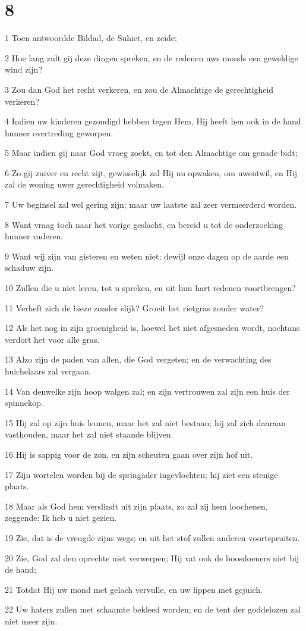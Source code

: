 \chapter{8}

\par 1 Toen antwoordde Bildad, de Suhiet, en zeide:
\par 2 Hoe lang zult gij deze dingen spreken, en de redenen uws monds een geweldige wind zijn?
\par 3 Zou dan God het recht verkeren, en zou de Almachtige de gerechtigheid verkeren?
\par 4 Indien uw kinderen gezondigd hebben tegen Hem, Hij heeft hen ook in de hand hunner overtreding geworpen.
\par 5 Maar indien gij naar God vroeg zoekt, en tot den Almachtige om genade bidt;
\par 6 Zo gij zuiver en recht zijt, gewisselijk zal Hij nu opwaken, om uwentwil, en Hij zal de woning uwer gerechtigheid volmaken.
\par 7 Uw beginsel zal wel gering zijn; maar uw laatste zal zeer vermeerderd worden.
\par 8 Want vraag toch naar het vorige geslacht, en bereid u tot de onderzoeking hunner vaderen.
\par 9 Want wij zijn van gisteren en weten niet; dewijl onze dagen op de aarde een schaduw zijn.
\par 10 Zullen die u niet leren, tot u spreken, en uit hun hart redenen voortbrengen?
\par 11 Verheft zich de bieze zonder slijk? Groeit het rietgras zonder water?
\par 12 Als het nog in zijn groenigheid is, hoewel het niet afgesneden wordt, nochtans verdort het voor alle gras.
\par 13 Alzo zijn de paden van allen, die God vergeten; en de verwachting des huichelaars zal vergaan.
\par 14 Van denwelke zijn hoop walgen zal; en zijn vertrouwen zal zijn een huis der spinnekop.
\par 15 Hij zal op zijn huis leunen, maar het zal niet bestaan; hij zal zich daaraan vasthouden, maar het zal niet staande blijven.
\par 16 Hij is sappig voor de zon, en zijn scheuten gaan over zijn hof uit.
\par 17 Zijn wortelen worden bij de springader ingevlochten; hij ziet een stenige plaats.
\par 18 Maar als God hem verslindt uit zijn plaats, zo zal zij hem loochenen, zeggende: Ik heb u niet gezien.
\par 19 Zie, dat is de vreugde zijns wegs; en uit het stof zullen anderen voortspruiten.
\par 20 Zie, God zal den oprechte niet verwerpen; Hij vat ook de boosdoeners niet bij de hand;
\par 21 Totdat Hij uw mond met gelach vervulle, en uw lippen met gejuich.
\par 22 Uw haters zullen met schaamte bekleed worden; en de tent der goddelozen zal niet meer zijn.

